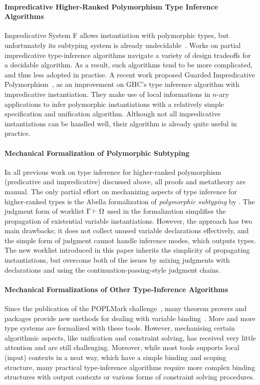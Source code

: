 \paragraph{Impredicative Higher-Ranked Polymorphism Type Inference Algorithms}
Impredicative System F allows instantiation with polymorphic types,
but unfortunately its subtyping system is already undecidable~\cite{tiuryn1996subtyping}.
Works on partial impredicative type-inference algorithms\cite{le2003ml,leijen2008hmf,vytiniotis2008fph}
navigate a variety of design tradeoffs for a decidable algorithm.
As a result, such algorithms tend to be more complicated, and thus less adopted in practise.
A recent work proposed Guarded Impredicative Polymorphism~\cite{},
as an improvement on GHC's type inference algorithm with impredicative instantiation.
They make use of local informations in $n$-ary applications to
infer polymorphic instantiations with a relatively simple specification and unification algorithm.
Although not all impredicative instantiations can be handled well,
their algorithm is already quite useful in practice.

\paragraph{Mechanical Formalization of Polymorphic Subtyping}
In all previous work on type inference for higher-ranked polymorphism
(predicative and impredicative) discussed above, all proofs and
metatheory are manual. The only partial effort on mechanizing aspects of type inference
for higher-ranked types is
the Abella formalization of \emph{polymorphic subtyping} by \citet{itp2018}.
The judgment form of worklist $\Gamma \vdash \Omega$ used in the formalization simplifies
the propagation of existential variable instantiations.
However, the approach has two main drawbacks;
it does not collect unused variable declarations effectively,
and the simple form of judgment cannot handle inference modes, which outputs types.
The new worklist introduced in this paper inherits the simplicity of propagating instantiations,
but overcome both of the issues by mixing judgments with declarations
and using the continuation-passing-style judgment chains.

\paragraph{Mechanical Formalizations of Other Type-Inference Algorithms}
Since the publication of the {\sc POPLMark} challenge~\cite{aydemir2005mechanized},
many theorem provers and packages provide new methods for dealing
with variable binding~\cite{aydemir2008engineering,urban2008nominalTech,chlipala2008parametric}.
More and more type systems are formalized with these tools.
However, mechanising certain algorithmic aspects, like unification and
constraint solving, has received very little attention and are still challenging.
Moreover, while most tools supports local (input) contexts in a neat way, which have a simple
binding and scoping structure, many practical type-inference algorithms require
more complex binding structures with output contexts or various forms of constraint solving procedures.

